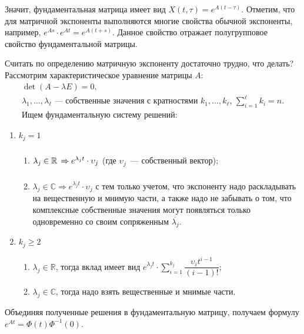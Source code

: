 Значит, фундаментальная матрица
имеет вид $X(t, \tau) = e^{A(t - \tau)}$.
Отметим, что для матричной экспоненты
выполняются многие свойства обычной экспоненты,
например, $e^{As} \cdot e^{At} = e^{A(t + s)}$.
Данное свойство отражает полугрупповое
свойство фундаментальной матрицы.

Считать по определению матричную экспоненту
достаточно трудно, что делать?
Рассмотрим характеристическое
уравнение матрицы $A$:
\begin{gather*}
  \det\left(A - \lambda E\right) = 0,\\
  \lambda_1, \ldots, \lambda_\ell
  \text{~--- собственные значения с кратностями }
  k_1, \ldots, k_\ell, \, \sum\limits_{i = 1}^{\ell}k_i = n.\\
  \text{Ищем фундаментальную систему решений:}
\end{gather*}

\begin{enumerate}
  \item
    $k_{j} = 1$
	  \begin{enumerate} 
		  \item
		    $\lambda_j \in \mathbb R\, \Rightarrow
		    \vphantom{
		      \sum\limits_{i = 1}^{k_{j}}
		      \dfrac{\upsilon_{i}t^{i - 1}}{(i - 1)!}
		             }
		    e^{\lambda_{j}t} \cdot \upsilon_j$
		    (где $\upsilon_j$~--- собственный вектор);
		  \item
		    $\lambda_j \in \mathbb C \Rightarrow
		    e^{\lambda_{j}t} \cdot \upsilon_j$
		    с тем только учетом, что экспоненту
		    надо раскладывать на вещественную и мнимую части,
		    а также надо не забывать о том,
		    что комплексные собственные значения
		    могут появляться только одновременно со
		    своим сопряженным $\overline{\lambda_j}$.
	  \end{enumerate}
  \item
    $k_{j} \geqslant 2$
	  \begin{enumerate}
		  \item
		    $\lambda_j \in \mathbb R$,
		    тогда вклад имеет вид
		    $e^{\lambda_{j}t}\cdot
		     \sum\limits_{i = 1}^{k_{j}}
		       \dfrac{\upsilon_{i}t^{i - 1}}{(i - 1)!}
		    $;
		  \item
		    $\lambda_j \in \mathbb C$,
		    тогда надо взять вещественные и мнимые части.
	  \end{enumerate}
\end{enumerate}

Объединяя полученные решения
в фундаментальную матрицу, получаем формулу
$e^{At} = \Phi(t)\Phi^{-1}(0)$.

